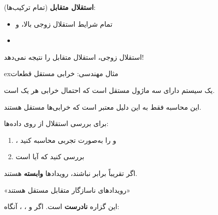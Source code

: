 \textbf{استقلال متقابل} (تمام ترکیب‌ها):

\begin{itemize}
\tightlist
\item
  تمام شرایط استقلال زوجی بالا، و
\item
\end{itemize}

\begin{PSquote}

\lr{\mbox{\PSwarn{}}} استقلال زوجی، استقلال متقابل را نتیجه نمی‌دهد!

\end{PSquote}

\begin{PSbox}[unbreakable]{ex}{مثال مهندسی: خرابی مستقل قطعات}

یک سیستم دارای سه ماژول مستقل است که احتمال خرابی هر یک  است.



این محاسبه فقط به این دلیل معتبر است که خرابی‌ها مستقل هستند.

\end{PSbox}


برای بررسی استقلال از روی داده‌ها:

\begin{enumerate}
\def\labelenumi{\arabic{enumi}.}
\tightlist
\item
  ،  و  را به‌صورت تجربی محاسبه کنید
\item
  بررسی کنید که آیا  است
\end{enumerate}

اگر تقریباً برابر نباشند، رویدادها \textbf{وابسته} هستند.


\begin{PSquote}

\lr{\mbox{\PSno{}}} «رویدادهای ناسازگار متقابل مستقل هستند»

\end{PSquote}

این گزاره \textbf{نادرست} است. اگر  و ، ، آنگاه:

